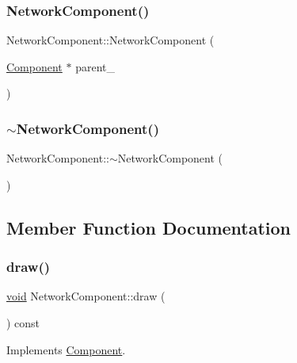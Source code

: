 \subsubsection{\texorpdfstring{Network\+Component()}{NetworkComponent()}}
{\footnotesize\ttfamily Network\+Component\+::\+Network\+Component (\begin{DoxyParamCaption}\item[{\hyperlink{classComponent}{Component} $\ast$}]{parent\+\_\+ }\end{DoxyParamCaption})}

\mbox{\label{classNetworkComponent_a05adbdf1cb3611bbfd937887065d3feb}} 
\subsubsection{\texorpdfstring{$\sim$\+Network\+Component()}{~NetworkComponent()}}
{\footnotesize\ttfamily Network\+Component\+::$\sim$\+Network\+Component (\begin{DoxyParamCaption}{ }\end{DoxyParamCaption})}



\subsection{Member Function Documentation}
\mbox{\label{classNetworkComponent_a43dbac0f78d86a74c3b22006db82b0e8}} 
\subsubsection{\texorpdfstring{draw()}{draw()}}
{\footnotesize\ttfamily \hyperlink{imgui__impl__opengl3__loader_8h_ac668e7cffd9e2e9cfee428b9b2f34fa7}{void} Network\+Component\+::draw (\begin{DoxyParamCaption}{ }\end{DoxyParamCaption}) const\hspace{0.3cm}{\ttfamily [virtual]}}



Implements \hyperlink{classComponent_a8f45309003f02191f2bcc8864e8e9ecf}{Component}.

